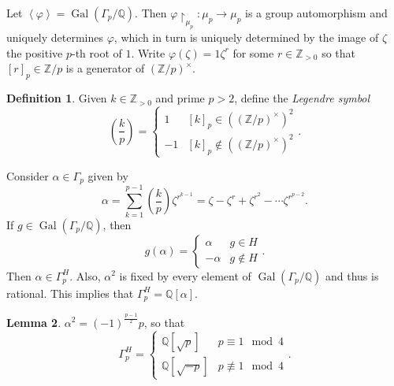 \documentclass[10pt,letterpaper,cm]{nupset}
\theoremstyle{definition}
\newtheorem{definition}{Definition}[subsection]
\theoremstyle{theorem}
\newtheorem{lemma}[definition]{Lemma}
\theoremstyle{remark}
\newcommand{\Q}{\mathbb Q}
\newcommand{\Z}{\mathbb Z}
\newcommand{\1}{\mathbf{1}}
\newcommand{\0}{\vec 0}
\DeclareMathOperator{\gal}{Gal}
\begin{document}
Let $\left\langle \varphi \right\rangle = \gal(\Gamma_p /\Q)$. Then $\varphi \restriction_{\mu_p} : \mu_p \to \mu_p$ is a group automorphism and  uniquely determines $\varphi$, which in turn is uniquely determined by the image of $\zeta$ the positive $p$-th root of $1$. Write $\varphi(\zeta) = 1\zeta^r$ for some $r \in \Z_{>0}$ so that $[r]_p \in \Z/p$ is a generator of $\left(\Z/p\right)^{\times}$. 
\begin{definition}
Given $k \in \Z_{>0}$ and prime $p>2$, define the \textit{Legendre symbol} $$\left(\frac{k}{p} \right) = \begin{cases}    1 & [k]_p \in \left(\left(\Z/p\right)^{\times}\right)^2 \\ {-1} & [k]_p \notin  \left(\left(\Z/p\right)^{\times}\right)^2  \end{cases}.$$
\end{definition}
Consider $\alpha \in \Gamma_p$ given by $$  \alpha = \sum_{k=1}^{p-1} \left(\frac{k}{p} \right) \zeta^{r^{k-1}} = \zeta - \zeta^r + \zeta^{r^2} - \cdots \zeta^{r^{p-2}}   .$$ If $g\in \gal(\Gamma_p /\Q)$, then $$ g(\alpha) = \begin{cases}  \alpha & g \in H \\ {-}\alpha & g \notin H   \end{cases} . $$ Then $\alpha \in \Gamma_p^H$. Also, $\alpha^2$ is fixed by every element of $\gal(\Gamma_p/\Q)$ and thus is rational. This implies that $\Gamma_p^H = \Q[\alpha]$.
\begin{lemma}\label{l16}
$\alpha^2 = \left({-1}\right)^{\frac{p-1}{2}}p$, so that $$\Gamma_p^H = \begin{cases} \Q\left[\sqrt{p}\right] & p \equiv 1 \mod 4 \\ \Q\left[\sqrt{{-p}}\right] & p \not \equiv 1 \mod 4   \end{cases}.$$
\end{lemma}
\end{document}
